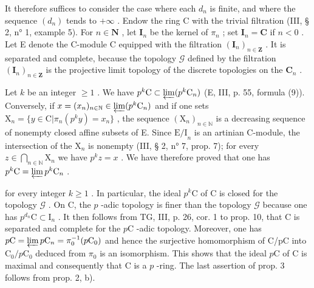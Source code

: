 It therefore suffices to consider the case where each \(d_{n}\) is finite, and where the sequence \((d_{n})\) tends to \(+\infty\) . Endow the ring C with the trivial filtration (III, § 2, n° 1, example 5). For \(n\in\mathbf{N}\) , let \(\mathbf{I}_{n}\) be the kernel of \(\pi_{n}\) ; set \(\mathbf{I}_{n}=\mathbf{C}\) if \(n<0\) . Let E denote the C-module C equipped with the filtration \((\mathbf{I}_{n})_{n\in\mathbf{Z}}\) . It is separated and complete, because the topology \(\mathcal{G}\) defined by the filtration \((\mathbf{I}_{n})_{n\in\mathbf{Z}}\) is the projective limit topology of the discrete topologies on the \(\mathbf{C}_{n}\) .

Let \(k\) be an integer \(\geqslant 1\) . We have \(p^{k}\mathrm{C} \subset \varprojlim (p^{k}\mathrm{C}_{n})\) (E, III, p. 55, formula (9)). Conversely, if \(x = (x_{n})_{n \in \mathbb{N}} \in \varprojlim (p^{k}\mathrm{C}_{n})\) and if one sets \(\mathrm{X}_{n} = \{y \in \mathrm{C}|\pi_{n}(p^{k}y) = x_{n}\}\) , the sequence \((\mathrm{X}_{n})_{n \in \mathbb{N}}\) is a decreasing sequence of nonempty closed affine subsets of E. Since \(\mathrm{E / I}_{n}\) is an artinian C-module, the intersection of the \(\mathrm{X}_{n}\) is nonempty (III, § 2, n° 7, prop. 7); for every \(z \in \bigcap_{n \in \mathbb{N}} \mathrm{X}_{n}\) we have \(p^{k}z = x\) . We have therefore proved that one has \(p^{k}\mathrm{C} = \varprojlim p^{k}\mathrm{C}_{n}\) .

for every integer \(k \geqslant 1\) . In particular, the ideal \(p^{k}\text{C}\) of C is closed for the topology \(\mathcal{G}\) . On C, the \(p\) -adic topology is finer than the topology \(\mathcal{G}\) because one has \(p^{d_{n}}\text{C} \subset \text{I}_{n}\) . It then follows from TG, III, p. 26, cor. 1 to prop. 10, that C is separated and complete for the \(p\text{C}\) -adic topology. Moreover, one has \(p\text{C} = \varprojlim p\text{C}_{n} = \pi_{0}^{-1}(p\text{C}_{0})\) and hence the surjective homomorphism of C/pC into \(\text{C}_{0}/p\text{C}_{0}\) deduced from \(\pi_{0}\) is an isomorphism. This shows that the ideal \(p\text{C}\) of C is maximal and consequently that C is a \(p\) -ring. The last assertion of prop. 3 follows from prop. 2, b).

